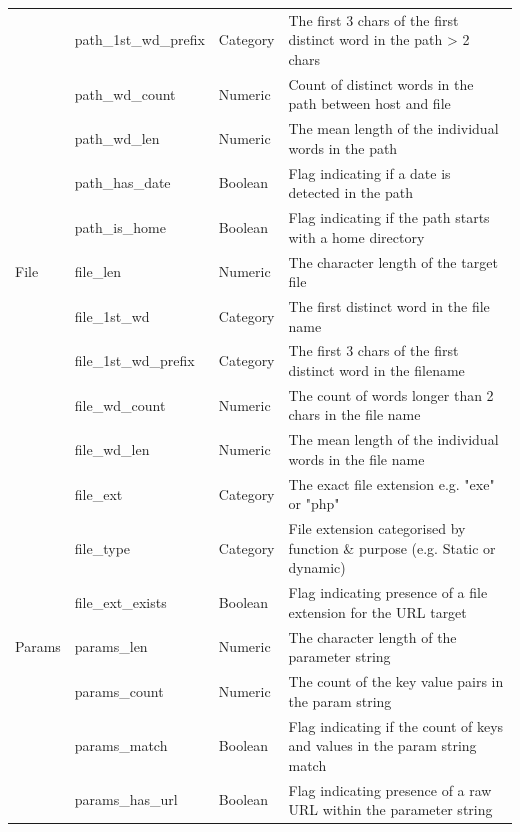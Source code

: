 \documentclass{aircc}
\begin{document}
\begin{table}
{\begin{tabular}{|l|l|l|l|}
              &path\_1st\_wd\_prefix  &Category    &The first 3 chars of the first distinct word in the path > 2 chars   \\
              &path\_wd\_count        &Numeric     &Count of distinct words in the path between host and file   \\
              &path\_wd\_len          &Numeric     &The mean length of the individual words in the path  \\
              &path\_has\_date        &Boolean     &Flag indicating if a date is detected in the path  \\
              &path\_is\_home         &Boolean     &Flag indicating if the path starts with a home directory    \\
\midrule 
File          &file\_len              &Numeric     &The character length of the target file    \\
              &file\_1st\_wd          &Category    &The first distinct word in the file name  \\
              &file\_1st\_wd\_prefix  &Category    &The first 3 chars of the first distinct word in the filename  \\
              &file\_wd\_count        &Numeric     &The count of words longer than 2 chars in the file name   \\
              &file\_wd\_len          &Numeric     &The mean length of the individual words in the file name  \\
              &file\_ext              &Category    &The exact file extension e.g. "exe" or "php"    \\
              &file\_type             &Category    &File extension categorised by function \& purpose (e.g. Static or dynamic)   \\
              &file\_ext\_exists      &Boolean     &Flag indicating presence of a file extension for the URL target  \\
\midrule
Params        &params\_len            &Numeric     &The character length of the parameter string    \\
              &params\_count          &Numeric     &The count of the key value pairs in the param string    \\
              &params\_match          &Boolean     &Flag indicating if the count of keys and values in the param string match    \\
              &params\_has\_url       &Boolean     &Flag indicating presence of a raw URL within the parameter string   \\

\end{tabular}}
\end{table}
\end{document}
